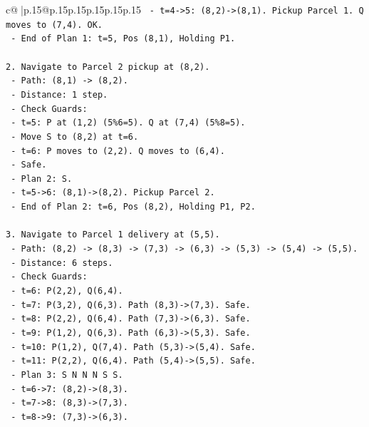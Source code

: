\documentclass{article}
\begin{document}
{\begin{supertabular}{c@{$\;$}|p{.15\linewidth}@{}p{.15\linewidth}p{.15\linewidth}p{.15\linewidth}p{.15\linewidth}p{.15\linewidth}}
{{{\texttt{     {-} t=4{-}>5: (8,2){-}>(8,1). Pickup Parcel 1. Q moves to (7,4). OK.} \\
\texttt{   {-} End of Plan 1: t=5, Pos (8,1), Holding P1.} \\
\\ 
\texttt{2. Navigate to Parcel 2 pickup at (8,2).} \\
\texttt{   {-} Path: (8,1) {-}> (8,2).} \\
\texttt{   {-} Distance: 1 step.} \\
\texttt{   {-} Check Guards:} \\
\texttt{     {-} t=5: P at (1,2) (5\%6=5). Q at (7,4) (5\%8=5).} \\
\texttt{     {-} Move S to (8,2) at t=6.} \\
\texttt{     {-} t=6: P moves to (2,2). Q moves to (6,4).} \\
\texttt{     {-} Safe.} \\
\texttt{   {-} Plan 2: S.} \\
\texttt{     {-} t=5{-}>6: (8,1){-}>(8,2). Pickup Parcel 2.} \\
\texttt{   {-} End of Plan 2: t=6, Pos (8,2), Holding P1, P2.} \\
\\ 
\texttt{3. Navigate to Parcel 1 delivery at (5,5).} \\
\texttt{   {-} Path: (8,2) {-}> (8,3) {-}> (7,3) {-}> (6,3) {-}> (5,3) {-}> (5,4) {-}> (5,5).} \\
\texttt{   {-} Distance: 6 steps.} \\
\texttt{   {-} Check Guards:} \\
\texttt{     {-} t=6: P(2,2), Q(6,4).} \\
\texttt{     {-} t=7: P(3,2), Q(6,3). Path (8,3){-}>(7,3). Safe.} \\
\texttt{     {-} t=8: P(2,2), Q(6,4). Path (7,3){-}>(6,3). Safe.} \\
\texttt{     {-} t=9: P(1,2), Q(6,3). Path (6,3){-}>(5,3). Safe.} \\
\texttt{     {-} t=10: P(1,2), Q(7,4). Path (5,3){-}>(5,4). Safe.} \\
\texttt{     {-} t=11: P(2,2), Q(6,4). Path (5,4){-}>(5,5). Safe.} \\
\texttt{   {-} Plan 3: S N N N S S.} \\
\texttt{     {-} t=6{-}>7: (8,2){-}>(8,3).} \\
\texttt{     {-} t=7{-}>8: (8,3){-}>(7,3).} \\
\texttt{     {-} t=8{-}>9: (7,3){-}>(6,3).} \\
}}}
\end{supertabular}}
\end{document}
